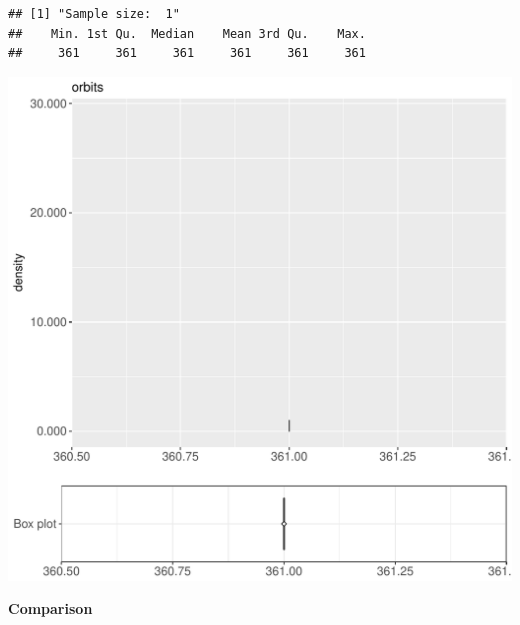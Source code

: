 \documentclass{article}\usepackage[]{graphicx}\usepackage[]{color}
\makeatletter
\def\maxwidth{ %
  \ifdim\Gin@nat@width>\linewidth
    \linewidth
  \else
    \Gin@nat@width
  \fi
}
\newenvironment{kframe}{%
 \def\at@end@of@kframe{}%
 \ifinner\ifhmode%
  \def\at@end@of@kframe{\end{minipage}}%
  \begin{minipage}{\columnwidth}%
 \fi\fi%
 \def\FrameCommand##1{\hskip\@totalleftmargin \hskip-\fboxsep
 \colorbox{shadecolor}{##1}\hskip-\fboxsep
     \hskip-\linewidth \hskip-\@totalleftmargin \hskip\columnwidth}%
 \MakeFramed {\advance\hsize-\width
   \@totalleftmargin\z@ \linewidth\hsize
   \@setminipage}}%
 {\par\unskip\endMakeFramed%
 \at@end@of@kframe}
\newenvironment{knitrout}{}{} %
\makeatother
\begin{document}
\begin{knitrout}
\color{fgcolor}\begin{kframe}
\begin{verbatim}
## [1] "Sample size:  1"
##    Min. 1st Qu.  Median    Mean 3rd Qu.    Max. 
##     361     361     361     361     361     361
\end{verbatim}


{\ttfamily\noindent\bfseries{}}\end{kframe}
\includegraphics[width=\maxwidth]{figure/RH6_cashewExceptReduce_small-1} 

\end{knitrout}
  
 \textbf{Comparison}
  
\end{document}
